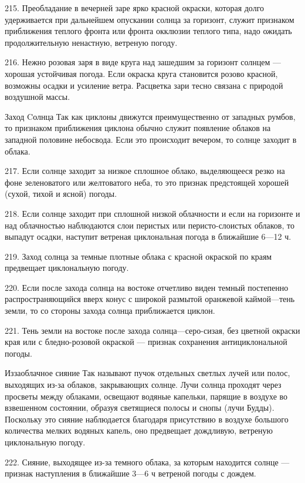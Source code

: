 215. Преобладание в вечерней заре ярко красной окраски, которая долго удерживается при дальнейшем опускании солнца за горизонт, служит признаком приближения теплого фронта или фронта окклюзии теплого типа, надо ожидать продолжительную ненастную, ветреную погоду.

216. Нежно розовая заря в виде круга над зашедшим за горизонт солнцем — хорошая устойчивая погода. Если окраска круга становится розово красной, возможны осадки и усиление ветра. Расцветка зари тесно связана с природой воздушной массы.

Заход Cолнца
Так как циклоны движутся преимущественно от западных румбов, то признаком приближения циклона обычно служит появление облаков на западной половине небосвода. Если это происходит вечером, то солнце заходит в облака.

217. Если солнце заходит за низкое сплошное облако, выделяющееся резко на фоне зеленоватого или желтоватого неба, то это признак предстоящей хорошей (сухой, тихой и ясной) погоды.

218. Если солнце заходит при сплошной низкой облачности и если на горизонте и над облачностью наблюдаются слои перистых или перисто-слоистых облаков, то выпадут осадки, наступит ветреная циклональная погода в ближайшие 6—12 ч.

219. Заход солнца за темные плотные облака с красной окраской по краям предвещает циклональную погоду.

220. Если после захода солнца на востоке отчетливо виден темный постепенно распространяющийся вверх конус с широкой размытой оранжевой каймой—тень земли, то со стороны захода солнца приближается циклон.

221. Тень земли на востоке после захода солнца—серо-сизая, без цветной окраски края или с бледно-розовой окраской — признак сохранения антициклональной погоды.

Иззаоблачное сияние
Так называют пучок отдельных светлых лучей или полос, выходящих из-за облаков, закрывающих солнце. Лучи солнца проходят через просветы между облаками, освещают водяные капельки, парящие в воздухе во взвешенном состоянии, образуя светящиеся полосы и снопы (лучи Будды). Поскольку это сияние наблюдается благодаря присутствию в воздухе большого количества мелких водяных капель, оно предвещает дождливую, ветреную циклональную погоду.

222. Сияние, выходящее из-за темного облака, за которым находится солнце — признак наступления в ближайшие 3—6 ч ветреной погоды с дождем.

